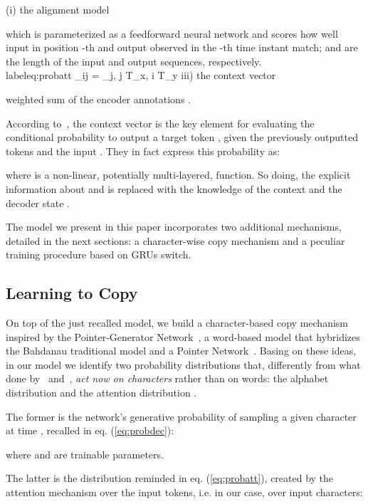 \documentclass[runningheads, envcountsame, a4paper]{llncs}
\begin{document}
\noindent (i) the alignment model 


\noindent which is parameterized as a feedforward neural network and scores how well input in position -th and output observed in the -th time instant match;  and  are the length of the input and output sequences, respectively. 
\\label{eq:probatt}
    \alpha_{ij} = \equiv [softmax(e_i)]_j, \: \: \leq j \leq  T_x, \: \: \leq i \leq T_y
iii) the context vector 

weighted sum of the encoder annotations .  

According to~\cite{Bahdanau:14}, the context vector  is the key element for evaluating the conditional probability  to output a target token , given the previously outputted tokens  and the input . They in fact express this probability as:

where  is a non-linear, potentially multi-layered, function. So doing, the explicit information about  and  is replaced with the knowledge of the context  and the decoder state .

The model we present in this paper incorporates two additional mechanisms, detailed in the next sections: a character-wise copy mechanism and a peculiar training procedure based on GRUs switch.

\subsection{Learning to Copy}
\label{sub:copy}
On top of the just recalled model, we build a character-based copy mechanism inspired by the Pointer-Generator Network~\cite{See:17}, a word-based model that hybridizes the Bahdanau traditional model and a Pointer Network~\cite{Vinyals:15}. Basing on these ideas, in our model we identify two probability distributions that, differently from what done by~\cite{See:17} and~\cite{Wiseman:17},  {\it act now on characters} rather than on words: the alphabet distribution  and the attention distribution . 

The former is the network's generative probability of sampling a given character at time , recalled in eq. (\ref{eq:probdec}):

\noindent where  and  are trainable parameters.

The latter is the distribution reminded in eq. (\ref{eq:probatt}), created by the attention mechanism over the input tokens, i.e. in our case, over input characters:
\end{document}
